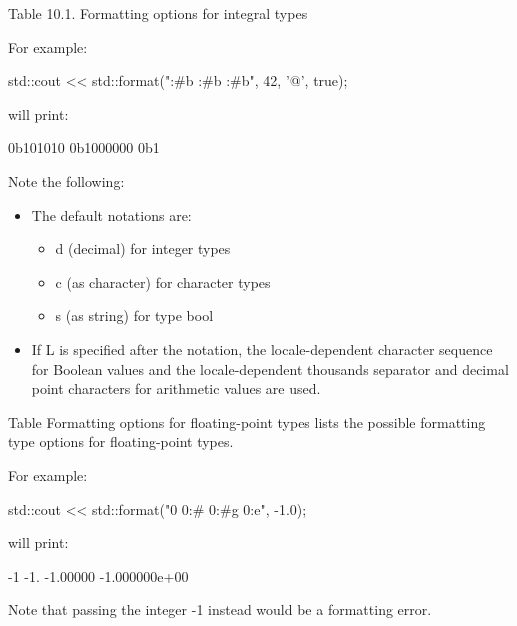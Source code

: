 \begin{center}
Table 10.1. Formatting options for integral types
\end{center}

For example:

\begin{cpp}
std::cout << std::format("{:#b} {:#b} {:#b}\n", 42, '@', true);
\end{cpp}

will print:

\begin{shell}
0b101010 0b1000000 0b1
\end{shell}

Note the following:

\begin{itemize}
\item 
The default notations are:

\begin{itemize}
\item 
d (decimal) for integer types

\item 
c (as character) for character types

\item 
s (as string) for type bool
\end{itemize}

\item 
If L is specified after the notation, the locale-dependent character sequence for Boolean values and the locale-dependent thousands separator and decimal point characters for arithmetic values are used.
\end{itemize}


Table Formatting options for floating-point types lists the possible formatting type options for floating-point types.

For example:

\begin{cpp}
std::cout << std::format("{0} {0:#} {0:#g} {0:e}\n", -1.0);
\end{cpp}

will print:

\begin{shell}
-1 -1. -1.00000 -1.000000e+00
\end{shell}

Note that passing the integer -1 instead would be a formatting error.

